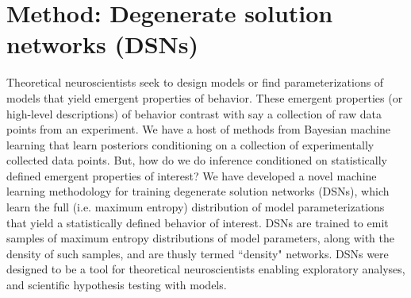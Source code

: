 \documentclass[11pt]{article}
\begin{document}
\section{Method: Degenerate solution networks (DSNs)}
Theoretical neuroscientists seek to design models or find parameterizations of models that yield emergent properties of behavior.  These emergent properties (or high-level descriptions) of behavior contrast with say a collection of raw data points from an experiment.  We have a host of methods from Bayesian machine learning that learn posteriors conditioning on a collection of experimentally collected data points. But, how do we do inference conditioned on statistically defined emergent properties of interest?  We have developed a novel machine learning methodology for training degenerate solution networks (DSNs), which learn the full (i.e. maximum entropy) distribution of model parameterizations that yield a statistically defined behavior of interest.  DSNs are trained to emit samples of maximum entropy distributions of model parameters, along with the density of such samples, and are thusly termed ``density" networks.  DSNs were designed to be a tool for theoretical neuroscientists enabling exploratory analyses, and scientific hypothesis testing with models.
 
\end{document}
